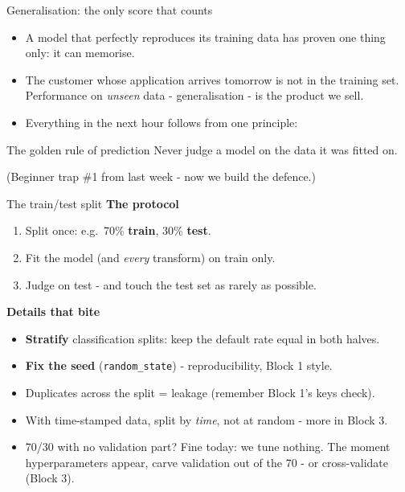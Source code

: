 \documentclass[10pt,aspectratio=169]{beamer}
\begin{document}
\begin{frame}{Generalisation: the only score that counts}
  \begin{itemize}
    \item A model that perfectly reproduces its training data has proven one
          thing only: it can \alert{memorise}.
    \item The customer whose application arrives tomorrow is not in the
          training set. Performance on \emph{unseen} data - generalisation
          - is the product we sell.
    \item Everything in the next hour follows from one principle:
  \end{itemize}
  \vspace{0.6em}
  \begin{block}{The golden rule of prediction}
    Never judge a model on the data it was fitted on.
  \end{block}
  \vspace{0.4em}
  \begin{center}\small
    (Beginner trap \#1 from last week - now we build the defence.)
  \end{center}
\end{frame}

\begin{frame}{The train/test split}
  \textbf{The protocol}
  \begin{enumerate}\small
    \item Split once: e.g.\ 70\% \textbf{train}, 30\% \textbf{test}.
    \item Fit the model (and \emph{every} transform) on train only.
    \item Judge on test - and touch the test set \alert{as rarely as possible}.
  \end{enumerate}
  \vspace{0.5em}
  \textbf{Details that bite}
  \begin{itemize}\small
    \item \textbf{Stratify} classification splits: keep the default rate equal
          in both halves.
    \item \textbf{Fix the seed} (\texttt{random\_state}) - reproducibility,
          Block 1 style.
    \item Duplicates across the split = leakage (remember Block 1's keys check).
    \item With time-stamped data, split by \emph{time}, not at random -
          more in Block 3.
    \item 70/30 with no validation part? Fine \alert{today}: we tune nothing.
          The moment hyperparameters appear, carve validation out of the 70
          - or cross-validate (Block 3).
  \end{itemize}
\end{frame}
\end{document}
